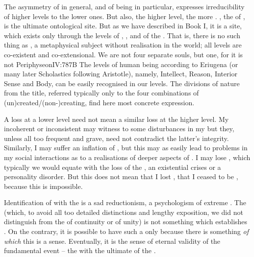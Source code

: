 \pa\label{noselfsense} The asymmetry of  in general,
 and of being  in particular, %
expresses irreducibility of higher levels to the lower ones. But also, the
higher level, the more .  , the  of , is
the ultimate ontological site.  But as we have described in Book I, it is a
 site, which exists only through the levels of ,
,  and  of the .  That is, there
is no such thing as  , a metaphysical subject without
 realisation in the world; all levels are co-existent and
co-extensional. We are not four separate souls, but one, for it is not \citet{a
  diversity of parts -- if we have to assert that it has parts -- which is
  distinguished in the soul, but a variety of functions and
  movements.}{Periphyseon}{IV:787B\kilde{[p.111]}
  The levels of human being according to Eriugena (or many
  later Scholastics following Aristotle), namely, Intellect, Reason, Interior
  Sense and Body, can be  easily recognised in our levels.  The divisions of nature from the
title, referred typically only to the four combinations of
(un)created/(non-)creating, find here most concrete expression. 
}

A loss at a lower level need not mean a similar loss at the higher level.  My
incoherent or inconsistent  may witness to some disturbances in my
 but they, unless all too frequent and grave, need not contradict the
latter's integrity. Similarly, I may suffer an inflation of , but this
may as easily lead to problems in my social interactions as to a realisations of
deeper aspects of . I may lose , which typically we would
equate with the loss of the , an existential crises or
a personality disorder. But this does not mean that I lost , that I
ceased to be , because this is impossible.

Identification of  with the  is a sad reductionism,
a psychologism of extreme .  The  (which, to
avoid all too detailed distinctions and lengthy exposition, we did not
distinguish from the  of continuity or of unity) is not something
which establishes .  On the contrary, it is possible to have such a
 only because there is something {\em of which} this is a sense.
Eventually, it is the sense of eternal validity of the fundamental event -- the
 with the ultimate  of the .

